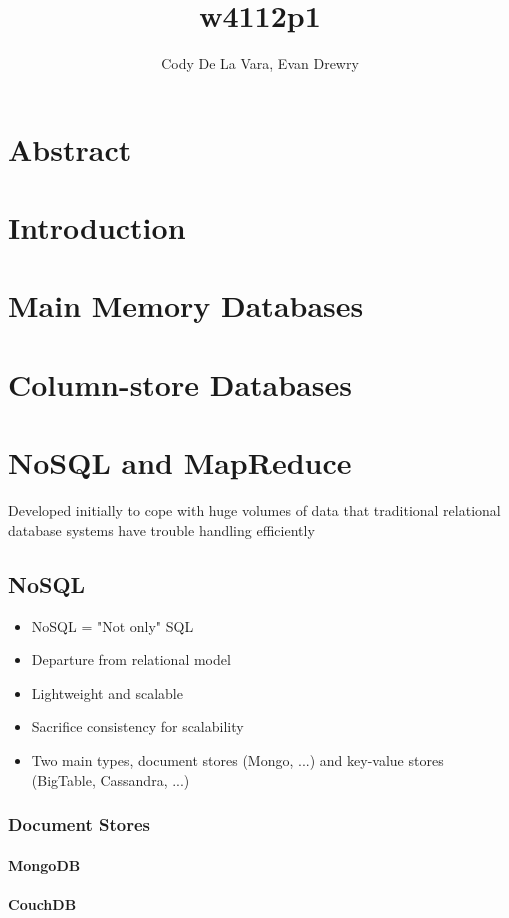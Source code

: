 \documentclass[11pt,a4paper]{article}
\author{Cody De La Vara, Evan Drewry}
\title{w4112p1}
\begin{document}
\maketitle

\section*{Abstract}
\section*{Introduction}
\section*{Main Memory Databases}
\section*{Column-store Databases}

\section*{NoSQL and MapReduce}
Developed initially to cope with huge volumes of data that traditional relational database systems have trouble handling efficiently
\subsection*{NoSQL}
\begin{itemize}
\item NoSQL = "Not only" SQL 
\item Departure from relational model
\item Lightweight and scalable
\item Sacrifice consistency for scalability
\item Two main types, document stores (Mongo, ...) and key-value stores (BigTable, Cassandra, ...)
\end{itemize}
\subsubsection*{Document Stores}
\paragraph*{MongoDB}
\paragraph*{CouchDB}
\end{document}
